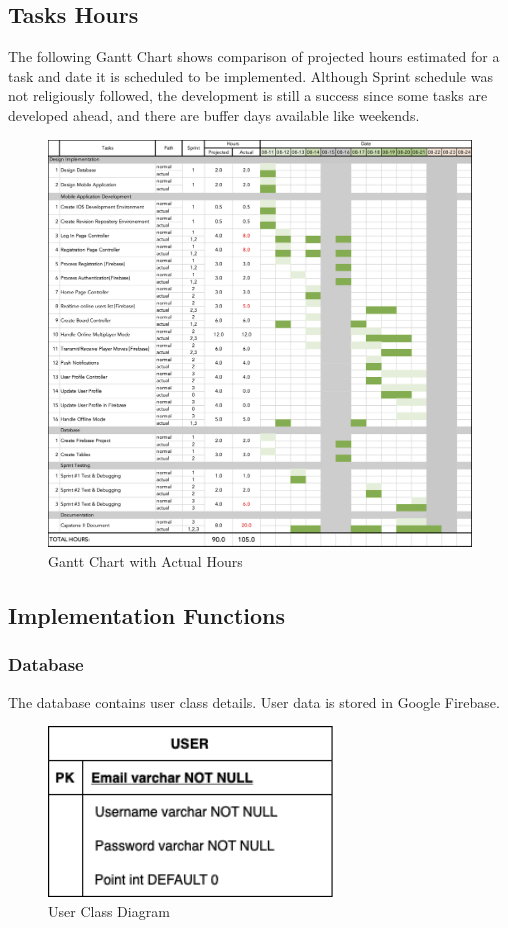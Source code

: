 \documentclass{article}
\begin{document}
\subsection{Tasks Hours}
The following Gantt Chart shows comparison of projected hours estimated for a task and date it is scheduled to be implemented.  Although Sprint schedule was not religiously followed, the development is still a success since some tasks are developed ahead, and there are buffer days available like weekends.  
        \begin{figure}[h]
            \centering
            \includegraphics[width=5.5in]{images/Gantt Actual.png}
        \caption{Gantt Chart with Actual Hours}
        \end{figure}
        \newpage  
\newpage
\subsection{Implementation Functions}
    \subsubsection{Database}
    The database contains user class details.  User data is stored in Google Firebase.
        \begin{figure}[h]
            \centering
            \includegraphics[width=3in]{images/TTRT.png}
        \caption{User Class Diagram}
        \end{figure}
        \newpage   
\end{document}
